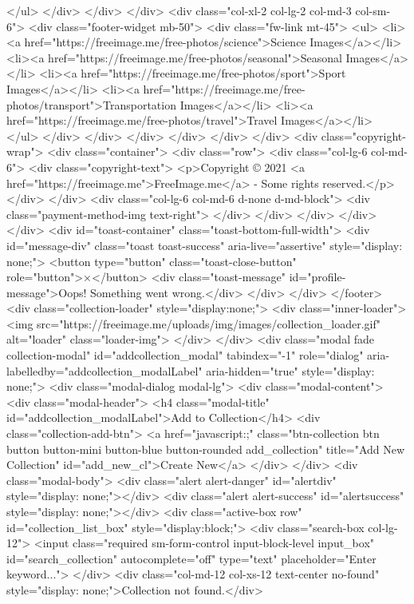 </ul>
</div>
</div>
</div>
<div class="col-xl-2 col-lg-2 col-md-3 col-sm-6">
<div class="footer-widget mb-50">
<div class="fw-link mt-45">
<ul>
<li><a href="https://freeimage.me/free-photos/science">Science Images</a></li>
<li><a href="https://freeimage.me/free-photos/seasonal">Seasonal Images</a></li>
<li><a href="https://freeimage.me/free-photos/sport">Sport Images</a></li>
<li><a href="https://freeimage.me/free-photos/transport">Transportation Images</a></li>
<li><a href="https://freeimage.me/free-photos/travel">Travel Images</a></li>
</ul>
</div>
</div>
</div>
</div>
</div>
</div>
<div class="copyright-wrap">
<div class="container">
<div class="row">
<div class="col-lg-6 col-md-6">
<div class="copyright-text">
<p>Copyright © 2021 <a href="https://freeimage.me">FreeImage.me</a> - Some rights reserved.</p>
</div>
</div>
<div class="col-lg-6 col-md-6 d-none d-md-block">
<div class="payment-method-img text-right">
</div>
</div>
</div>
</div>
</div>
<div id="toast-container" class="toast-bottom-full-width">
<div id="message-div" class="toast toast-success" aria-live="assertive" style="display: none;">
<button type="button" class="toast-close-button" role="button">×</button>
<div class="toast-message" id="profile-message">Oops! Something went wrong.</div>
</div>
</div>
</footer>
<div class="collection-loader" style="display:none;">
<div class="inner-loader">
<img src="https://freeimage.me/uploads/img/images/collection_loader.gif" alt="loader" class="loader-img">
</div>
</div> 
<div class="modal fade collection-modal" id="addcollection_modal" tabindex="-1" role="dialog" aria-labelledby="addcollection_modalLabel" aria-hidden="true" style="display: none;">
<div class="modal-dialog modal-lg">
<div class="modal-content">
<div class="modal-header">
<h4 class="modal-title" id="addcollection_modalLabel">Add to Collection</h4>
<div class="collection-add-btn">
<a href="javascript:;" class="btn-collection btn button button-mini button-blue button-rounded add_collection" title="Add New Collection" id="add_new_cl">Create New</a>
</div>
</div>
<div class="modal-body">
<div class="alert alert-danger" id="alertdiv" style="display: none;"></div>
<div class="alert alert-success" id="alertsuccess" style="display: none;"></div>
<div class="active-box row" id="collection_list_box" style="display:block;">
<div class="search-box col-lg-12">
<input class="required sm-form-control input-block-level input_box" id="search_collection" autocomplete="off" type="text" placeholder="Enter keyword...">
</div>
<div class="col-md-12 col-xs-12 text-center no-found" style="display: none;">Collection not found.</div>
